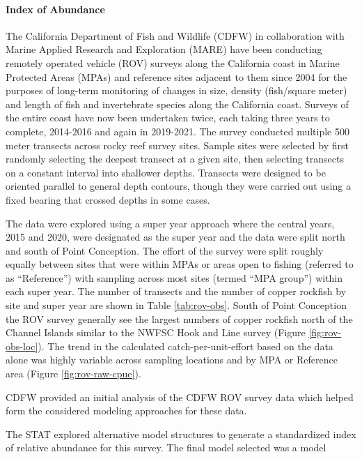 \documentclass[11pt,
  english,
  letterpaper,
]{article}
\begin{document}
\hypertarget{index-of-abundance-2}{%
\paragraph{Index of Abundance}\label{index-of-abundance-2}}

\hfill\break

The California Department of Fish and Wildlife (CDFW) in collaboration with Marine Applied Research and Exploration (MARE) have been conducting remotely operated vehicle (ROV) surveys along the California coast in Marine Protected Areas (MPAs) and reference sites adjacent to them since 2004 for the purposes of long-term monitoring of changes in size, density (fish/square meter) and length of fish and invertebrate species along the California coast. Surveys of the entire coast have now been undertaken twice, each taking three years to complete, 2014-2016 and again in 2019-2021. The survey conducted multiple 500 meter transects across rocky reef survey sites. Sample sites were selected by first randomly selecting the deepest transect at a given site, then selecting transects on a constant interval into shallower depths. Transects were designed to be oriented parallel to general depth contours, though they were carried out using a fixed bearing that crossed depths in some cases.

The data were explored using a super year approach where the central years, 2015 and 2020, were designated as the super year and the data were split north and south of Point Conception. The effort of the survey were split roughly equally between sites that were within MPAs or areas open to fishing (referred to as ``Reference'') with sampling across most sites (termed ``MPA group'') within each super year. The number of transects and the number of copper rockfish by site and super year are shown in Table \ref{tab:rov-obs}. South of Point Conception the ROV survey generally see the largest numbers of copper rockfish north of the Channel Islands similar to the NWFSC Hook and Line survey (Figure \ref{fig:rov-obs-loc}). The trend in the calculated catch-per-unit-effort based on the data alone was highly variable across sampling locations and by MPA or Reference area (Figure \ref{fig:rov-raw-cpue}).

CDFW provided an initial analysis of the CDFW ROV survey data which helped form the considered modeling approaches for these data.

The STAT explored alternative model structures to generate a standardized index of relative abundance for this survey. The final model selected was a model
\end{document}
